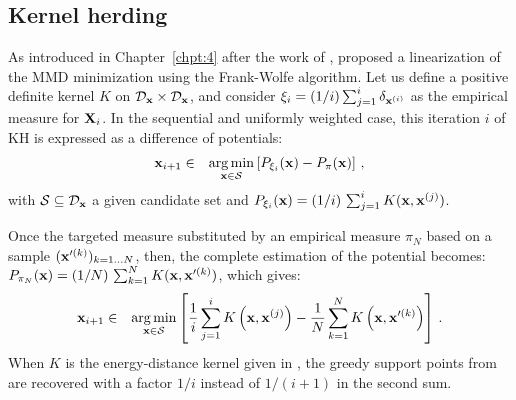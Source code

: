 \subsection{Kernel herding}\label{sec:C5_KH}
As introduced in Chapter~\ref{chpt:4} after the work of \citet{chen_welling_2010}, \citet{lacoste_2015} proposed a linearization of the MMD minimization using the Frank-Wolfe algorithm. 
Let us define a positive definite kernel $K$ on $\mathcal{D}_{\bf x}\times\mathcal{D}_{\bf x}$, and consider $\xi_i=(1/i)\sum_{j=1}^i \delta_{{\bf x}^{(i)}}$ as the empirical measure for ${\bf X}_i$.  
In the sequential and uniformly weighted case, this iteration $i$ of KH is expressed as a difference of potentials: 
\begin{eqnarray}\label{eq:KH}
{\bf x}_{i+1} &\in& \operatorname*{arg\,min}_{{\bf x}\in\mathcal{S}} \left[P_{\xi_i}({\bf x})-P_{\pi}({\bf x})\right] \,,
\end{eqnarray}
with $\mathcal{S}\subseteq\mathcal{D}_{\bf x}$ a given candidate set and $P_{\xi_i}({\bf x}) = (1/i)\, \sum_{j=1}^i K({\bf x}, {\bf x}^{(j)})$. 

Once the targeted measure substituted by an empirical measure $\pi_N$ based on a sample $({\bf x}'^{(k)})_{k=1\ldots N}$, then, the complete estimation of the potential becomes: 
$P_{\pi_N}({\bf x}) = (1/N)\, \sum_{k=1}^N K({\bf x}, {\bf x}'^{(k)})$, which gives:
\begin{eqnarray*}
{\bf x}_{i+1} &\in& \operatorname*{arg\,min}_{{\bf x}\in\mathcal{S}} \left[ \frac{1}{i} \sum_{j=1}^{i} K\left({\bf x},{\bf x}^{(j)}\right) - \frac{1}{N} \sum_{k=1}^N K\left({\bf x},{\bf x}'^{(k)}\right) \right] \,.
\end{eqnarray*}
When $K$ is the energy-distance kernel given in , the greedy support points from  are recovered with a factor $1/i$ instead of $1/(i+1)$ in the second sum. 

